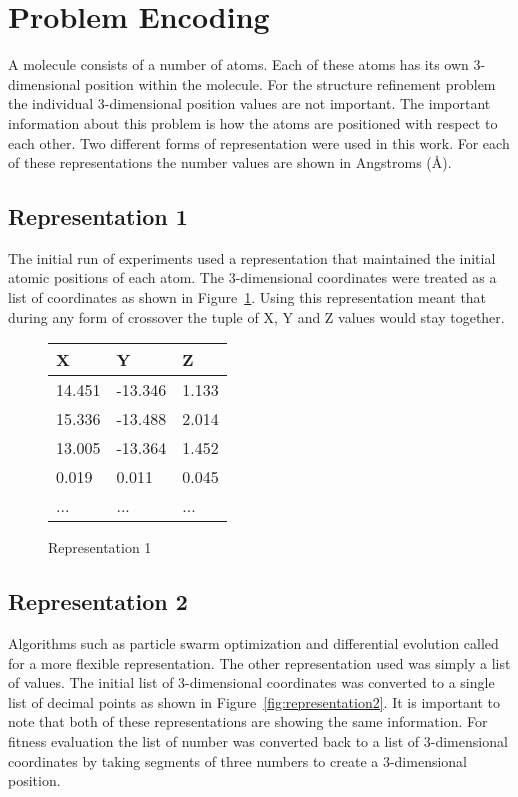 \section{Problem Encoding}

A molecule consists of a number of atoms. Each of these atoms has its own 3-dimensional position within the molecule. For the structure refinement problem the individual 3-dimensional position values are not important. The important information about this problem is how the atoms are positioned with respect to each other. Two different forms of representation were used in this work. For each of these representations the number values are shown in Angstroms (\AA).

\subsection{Representation 1}
\label{subsec:encoding-1}

The initial run of experiments used a representation that maintained the initial atomic positions of each atom. The 3-dimensional coordinates were treated as a list of coordinates as shown in Figure~\ref{fig:representation1}. Using this representation meant that during any form of crossover the tuple of X, Y and Z values would stay together.

\begin{figure}
	\centering
	\begin{tabular}{ | l | l | l | }
		\hline
		X & Y & Z \\ \hline
		14.451 & -13.346 & 1.133 \\ \hline
		15.336 & -13.488 & 2.014 \\ \hline
		13.005 & -13.364 & 1.452 \\ \hline
		0.019 & 0.011 & 0.045 \\ \hline
		... & ... & ... \\ \hline
	\end{tabular}
	\caption{Representation 1}
	\label{fig:representation1}
\end{figure}

\subsection{Representation 2}
\label{subsec:encoding-2}

Algorithms such as particle swarm optimization and differential evolution called for a more flexible representation. The other representation used was simply a list of values. The initial list of 3-dimensional coordinates was converted to a single list of decimal points as shown in Figure~\ref{fig:representation2}. It is important to note that both of these representations are showing the same information. For fitness evaluation the list of number was converted back to a list of 3-dimensional coordinates by taking segments of three numbers to create a 3-dimensional position.

